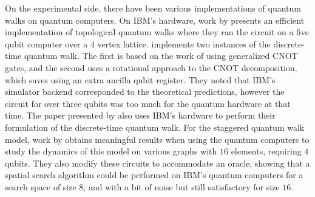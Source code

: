 \documentclass[../../dissertation.tex]{subfiles}
\begin{document}
On the experimental side, there have been various implementations of
quantum walks on quantum computers. On IBM's hardware, work by \cite{balu2017}
presents an efficient implementation of topological quantum walks where they
ran the circuit on a five qubit computer over a $4$ vertex lattice.
\cite{Georgopoulos2019} implements two instances of the discrete-time quantum
walk. The first is based on the work of \cite{douglaswang07} using generalized
CNOT gates, and the second uses a rotational approach to the CNOT
decomposition, which saves using an extra ancilla qubit register. They noted
that IBM's simulator backend corresponded to the theoretical predictions,
however the circuit for over three qubits was too much for the quantum hardware
at that time. The paper presented by \cite{shakeel2020} also uses IBM's
hardware to perform their formulation of the discrete-time quantum walk. For
the staggered quantum walk model, work by \cite{acasiete2020} obtains
meaningful results when using the quantum computers to study the dynamics of
this model on various graphs with $16$ elements, requiring $4$ qubits. They
also modify these circuits to accommodate an oracle, showing that a spatial
search algorithm could be performed on IBM's quantum computers for a search
space of size $8$, and with a bit of noise but still satisfactory for size
$16$.
\end{document}
